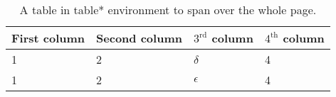 \begin{table*}[tpb]
    \centering
    \caption{A table in table* environment to span over the whole page.}
    \begin{tabular}{p{2cm} p{2cm} p{2cm} p{2cm}}
        \toprule
        First column & Second column & $\mathrm{3^{rd}}$ column & $\mathrm{4^{th}}$ column
        \tabularnewline\midrule
        1 & 2 & $\delta$   & 4
        \tabularnewline
        1 & 2 & $\epsilon$ & 4
        \tabularnewline\bottomrule
    \end{tabular}
    \label{tab:table5}
\end{table*}
